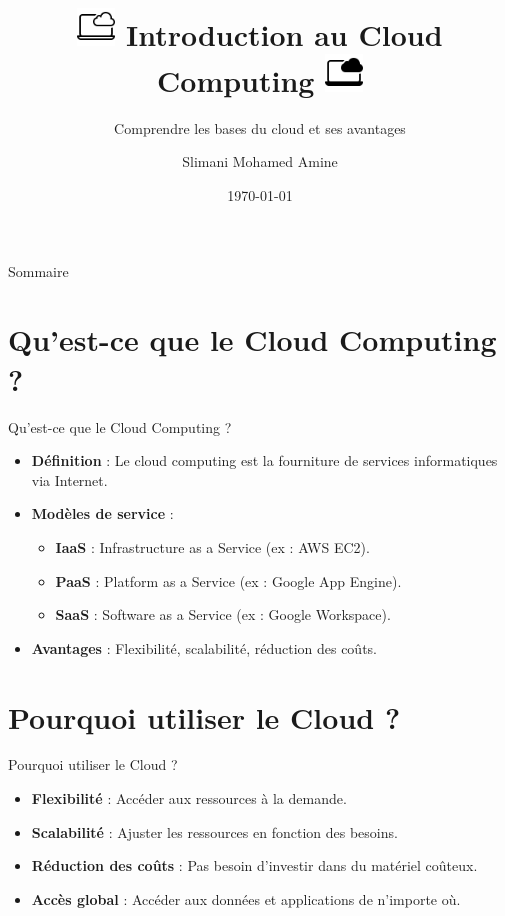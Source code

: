 \documentclass{clbeamer2024}
\title{
	\includegraphics[width=1cm]{logos/cloud.png} \hfill
	Introduction au Cloud Computing
	\includegraphics[width=1cm]{logos/cloud2.png} \hfill
}
\subtitle{Comprendre les bases du cloud et ses avantages}
\author{Slimani Mohamed Amine}
\institute{}
\date{\today}
\begin{document}
	\setcounter{framenumber}{-1}
	\frame{\titlepage}
	
	
	
	\begin{frame}{Sommaire}
		\tableofcontents
	\end{frame}
	
	\section{Qu'est-ce que le Cloud Computing ?}
	\begin{frame}{Qu'est-ce que le Cloud Computing ?}
		\begin{itemize}
			\item \textbf{Définition} : Le cloud computing est la fourniture de services informatiques via Internet.
			\item \textbf{Modèles de service} :
			\begin{itemize}
				\item \textbf{IaaS} : Infrastructure as a Service (ex : AWS EC2).
				\item \textbf{PaaS} : Platform as a Service (ex : Google App Engine).
				\item \textbf{SaaS} : Software as a Service (ex : Google Workspace).
			\end{itemize}
			\item \textbf{Avantages} : Flexibilité, scalabilité, réduction des coûts.
		\end{itemize}
	\end{frame}
	
	
	\section{Pourquoi utiliser le Cloud ?}
	\begin{frame}{Pourquoi utiliser le Cloud ?}
		\begin{itemize}
			\item \textbf{Flexibilité} : Accéder aux ressources à la demande.
			\item \textbf{Scalabilité} : Ajuster les ressources en fonction des besoins.
			\item \textbf{Réduction des coûts} : Pas besoin d'investir dans du matériel coûteux.
			\item \textbf{Accès global} : Accéder aux données et applications de n'importe où.
		\end{itemize}
	\end{frame}
	
\end{document}

